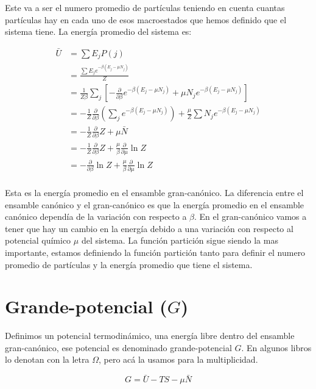 \documentclass[11pt,fleqn]{book}
\begin{document}
Este va a ser el numero promedio de partículas teniendo en cuenta cuantas partículas hay en cada uno de esos macroestados que hemos definido que el sistema tiene. La energía promedio del sistema es:

\begin{equation}
    \begin{split}
        \bar{U}&=\sum E_{j}P(j)\\
        &=\frac{\sum E_{j}e^{-\beta(E_{j}-\mu N_{j})}}{Z}\\
        &=\frac{1}{Z\beta}\sum_{j}\left[-\frac{\partial}{\partial\beta}e^{-\beta(E_{j}-\mu N_{j})}+\mu N_{j}e^{-\beta(E_{j}-\mu N_{j})}\right]\\
        &=-\frac{1}{Z}\frac{\partial}{\partial\beta}\left(\sum_{j}e^{-\beta(E_{j}-\mu N_{j})}\right)+\frac{\mu}{Z}\sum N_{j}e^{-\beta(E_{j}-\mu N_{j})}\\
        &=-\frac{1}{Z}\frac{\partial}{\partial\beta}Z+\mu \bar{N}\\
        &=-\frac{1}{Z}\frac{\partial}{\partial\beta}Z+\frac{\mu}{\beta}\frac{\partial}{\partial\mu}\ln{Z}\\
        &=-\frac{\partial}{\partial\beta}\ln{Z}+\frac{\mu}{\beta}\frac{\partial}{\partial\mu}\ln{Z}\\
    \end{split}
    \label{Eq. 5.10}
\end{equation}

Esta es la energía promedio en el ensamble gran-canónico. La diferencia entre el ensamble canónico y el gran-canónico es que la energía promedio en el ensamble canónico dependía de la variación con respecto a $\beta$. En el gran-canónico vamos a tener que hay un cambio en la energía debido a una variación con respecto al potencial químico $\mu$ del sistema. La función partición sigue siendo la mas importante, estamos definiendo la función partición tanto para definir el numero promedio de partículas y la energía promedio que tiene el sistema.  

\section{Grande-potencial ($G$)}

Definimos un potencial termodinámico, una energía  libre dentro del ensamble gran-canónico, ese potencial es denominado grande-potencial $G$. En algunos libros lo denotan con la letra $\Omega$, pero acá la usamos para la multiplicidad.

\begin{equation}
G=\bar{U}-TS-\mu \bar{N}    
    \label{Eq. 5.11}
\end{equation}
\end{document}
